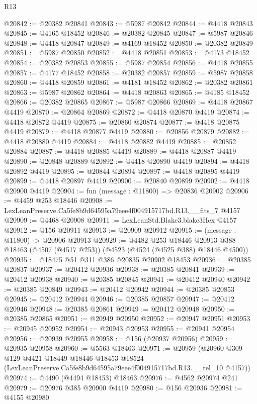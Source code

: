 \begin{lexlean}{R13}
\begin{coremodule}
@20842 := @20382 @20841
@20843 := @5987 @20842
@20844 := @4418 @20843
@20845 := @4165 @18452
@20846 := @20382 @20845
@20847 := @5987 @20846
@20848 := @4418 @20847
@20849 := @4169 @18452
@20850 := @20382 @20849
@20851 := @5987 @20850
@20852 := @4418 @20851
@20853 := @4173 @18452
@20854 := @20382 @20853
@20855 := @5987 @20854
@20856 := @4418 @20855
@20857 := @4177 @18452
@20858 := @20382 @20857
@20859 := @5987 @20858
@20860 := @4418 @20859
@20861 := @4181 @18452
@20862 := @20382 @20861
@20863 := @5987 @20862
@20864 := @4418 @20863
@20865 := @4185 @18452
@20866 := @20382 @20865
@20867 := @5987 @20866
@20869 := @4418 @20867 @4419
@20870 := @20864 @20869
@20872 := @4418 @20870 @4419
@20874 := @4418 @20872 @4419
@20875 := @20860 @20874
@20877 := @4418 @20875 @4419
@20879 := @4418 @20877 @4419
@20880 := @20856 @20879
@20882 := @4418 @20880 @4419
@20884 := @4418 @20882 @4419
@20885 := @20852 @20884
@20887 := @4418 @20885 @4419
@20889 := @4418 @20887 @4419
@20890 := @20848 @20889
@20892 := @4418 @20890 @4419
@20894 := @4418 @20892 @4419
@20895 := @20844 @20894
@20897 := @4418 @20895 @4419
@20899 := @4418 @20897 @4419
@20900 := @20840 @20899
@20902 := @4418 @20900 @4419
@20904 := fun (message : @11800) => @20836 @20902
@20906 := @4459 @253 @18446
@20908 := LexLeanPreserve.Ca5fe8b9d64595a79eee4f004915717bd.R13.__fits_7 @4157
@20909 := @4468 @20908
@20911 := LexLeanStd.Blake3.blake3Hex @4157
@20912 := @156 @20911
@20913 := @20909 @20912
@20915 := (message : @11800) -> @20906 @20913
@20929 := @4482
    @253
    @18446
    @20913
    @388
    @18463
    (@4507 (@4517 @253))
    (@4523 (@4524 (@4525 @388) @18446 @4500))
@20935 := @18475 @51 @311 @386 @20835 @20902 @18453
@20936 := @20385 @20837
@20937 := @20412 @20936
@20938 := @20385 @20841
@20939 := @20412 @20938
@20940 := @20385 @20845
@20941 := @20412 @20940
@20942 := @20385 @20849
@20943 := @20412 @20942
@20944 := @20385 @20853
@20945 := @20412 @20944
@20946 := @20385 @20857
@20947 := @20412 @20946
@20948 := @20385 @20861
@20949 := @20412 @20948
@20950 := @20385 @20865
@20951 := @20949 @20950
@20952 := @20947 @20951
@20953 := @20945 @20952
@20954 := @20943 @20953
@20955 := @20941 @20954
@20956 := @20939 @20955
@20958 := @156 (@20937 @20956)
@20959 := @20935 @20958
@20960 := @5563 @18463
@20971 := @20959
    (@20960
      @309
      @129
      @4421
      @18449
      @18446
      @18453
      @18524
      (LexLeanPreserve.Ca5fe8b9d64595a79eee4f004915717bd.R13.__rel_10 @4157))
@20974 := @4490 (@4494 @18453) @18463
@20976 := @4562 @20974 @241
@20979 := @20976 @385 @20900 @4419
@20980 := @156 @20936
@20981 := @4155 @20980

\end{coremodule}
\end{lexlean}
